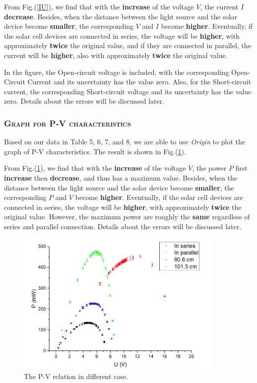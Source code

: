 \documentclass[a4paper,12pt]{article}
\begin{document}
From Fig.(\ref{IU}), we find that with the \textbf{increase} of the voltage $V$, the current $I$ \textbf{decrease}. Besides, when the distance between the light source and the solar device become \textbf{smaller}, the corresponding $V$ and $I$ become \textbf{higher}. Eventually, if the solar cell devices are connected in series, the voltage will be \textbf{higher}, with approximately \textbf{twice} the original value, and if they are connected in parallel, the current will be \textbf{higher}, also with approximately \textbf{twice} the original value.
\par In the figure, the Open-circuit voltage is included, with the corresponding Open-Circuit Current and its uncertainty has the value zero. Also, for the Short-circuit current, the corresponding Short-circuit voltage and its uncertainty has the value zero. Details about the errors will be discussed later.

\subsubsection{\textsc{Graph for P-V characteristics}}
Based on our data in Table 5, 6, 7, and 8, we are able to use \textit{Origin} to plot the graph of P-V characteristics. The result is shown in Fig.(\ref{PU}).

\par From Fig.(\ref{PU}), we find that with the \textbf{increase} of the voltage $V$, the power $P$ first \textbf{increase} then \textbf{decrease}, and thus has a maximum value. Besides, when the distance between the light source and the solar device become \textbf{smaller}, the corresponding $P$ and $V$ become \textbf{higher}. Eventually, if the solar cell devices are connected in series, the voltage will be \textbf{higher}, with approximately \textbf{twice} the original value. However, the maximum power are roughly the \textbf{same} regardless of series and parallel connection. Details about the errors will be discussed later.

\begin{figure}[H] 
    \centering
    \includegraphics[width=0.9\textwidth]{PU} 
    \caption{The P-V relation in different case.} 
    \label{PU}    
\end{figure}
\end{document}
